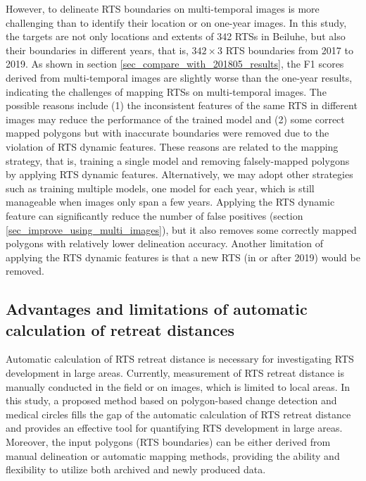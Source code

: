 \documentclass[authoryear,preprint,review,12pt]{elsarticle}
\begin{document}
However, to delineate RTS boundaries on multi-temporal images is more challenging than to identify their location or on one-year images. 
In this study, the targets are not only locations and extents of 342 RTSs in Beiluhe, but also their boundaries in different years, that is, $342\times3$ RTS boundaries from 2017 to 2019.
As shown in section \ref{sec_compare_with_201805_results}, the F1 scores derived from multi-temporal images are slightly worse than the one-year results, indicating the challenges of mapping RTSs on multi-temporal images. 
The possible reasons include (1) the inconsistent features of the same RTS in different images may reduce the performance of the trained model 
and (2) some correct mapped polygons but with inaccurate boundaries were removed due to the violation of RTS dynamic features. 
These reasons are related to the mapping strategy, that is, training a single model and removing falsely-mapped polygons by applying RTS dynamic features.  
Alternatively, we may adopt other strategies such as training multiple models, one model for each year,  which is still manageable when images only span a few years.
Applying the RTS dynamic feature can significantly reduce the number of false positives (section \ref{sec_improve_using_multi_images}), but it also removes some correctly mapped polygons with relatively lower delineation accuracy. 
Another limitation of applying the RTS dynamic features is that a new RTS (in or after 2019) would be removed. 



\subsection{Advantages and limitations of automatic calculation of retreat distances}
\label{sec_diss_retreat_distance}

Automatic calculation of RTS retreat distance is necessary for investigating RTS development in large areas.
Currently, measurement of RTS retreat distance is manually conducted in the field or on images, which is limited to local areas. 
In this study, a proposed method based on polygon-based change detection and medical circles fills the gap of the automatic calculation of RTS retreat distance 
and provides an effective tool for quantifying RTS development in large areas. 
Moreover, the input polygons (RTS boundaries) can be either derived from manual delineation or automatic mapping methods, 
providing the ability and flexibility to utilize both archived and newly produced data.
\end{document}
